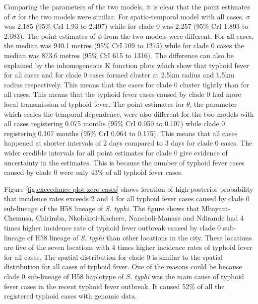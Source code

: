 Comparing the parameters of the two models, it is clear that the point estimates of $\sigma$ for the two models were similar. For spatio-temporal model with all cases, $\sigma$ was 2.185 (95\% CrI 1.93 to 2.497) while for clade 0 was 2.257 (95\% CrI 1.893 to 2.683). The point estimates of $\phi$ from the two models were different. For all cases, the median was 940.1 metres (95\% CrI 709 to 1275) while for clade 0 cases the median was 873.6 metres (95\% CrI 615 to 1316). The difference can also be explained by the inhomogeneous K function plots which show that typhoid fever for all cases and for clade 0 cases formed cluster at 2.5km radius and 1.5km radius respectively. This means that the cases for clade 0 cluster tightly than for all cases. This means that the typhoid fever cases caused by clade 0 had more local transmission of typhoid fever. The point estimates for $\theta$, the parameter which scales the temporal dependence, were also different for the two models with all cases registering 0.075 months  (95\% CrI 0.050 to 0.107) while clade 0 registering 0.107 months (95\% CrI 0.064 to 0.175). This means that all cases happened at shorter intervals of 2 days compared to 3 days for clade 0 cases. The wider credible intervals for all point estimates for clade 0 give evidence of uncertainty in the estimates. This is because the number of typhoid fever cases caused by clade 0 were only 43\% of all typhoid fever cases.

Figure \ref{fig:exceedance-plot-zero-cases} shows location of high posterior probability that incidence rates exceeds 2 and 4 for all typhoid fever cases caused by clade 0 sub-lineage of the H58 lineage of \textit{S. typhi}. The figure shows that Mbayani-Chemusa, Chirimba, Nkolokoti-Kachere, Nancholi-Manase and Ndirande had 4 times higher incidence rate of typhoid fever outbreak caused by clade 0 sub-lineage of H58 lineage of \textit{S. typhi} than other locations in the city. These locations are five of the seven locations with 4 times higher incidence rates of typhoid fever for all cases. The spatial distribution for clade 0 is similar to the spatial distribution for all cases of typhoid fever. One of the reasons could be because clade 0 sub-lineage of H58 haplotype of \textit{S. typhi} was the main cause of typhoid fever cases in the recent typhoid fever outbreak. It caused 52\% of all the registered typhoid cases with genomic data.

